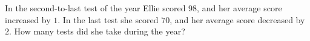 In the second-to-last test of the year Ellie scored $98$, and her average score increased by $1$. In the last test she scored $70$, and her average score decreased by $2$. How many tests did she take during the year?
